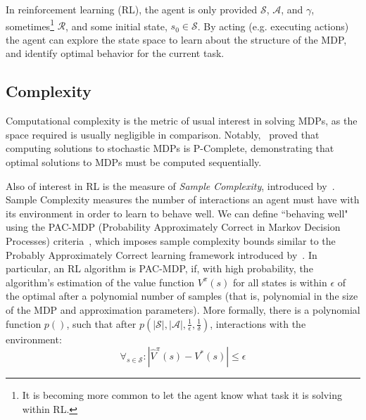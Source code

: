 \documentclass[11pt]{article}
\newcommand\davenote[1]{\textcolor{blue}{Dave: #1}}
\begin{document}

In reinforcement learning (RL), the agent is only provided $\mathcal{S}$, $\mathcal{A}$, and $\gamma$, sometimes\footnote{It is becoming more common to let the agent know what task it is solving within RL.} $\mathcal{R}$, and some initial state, $s_0 \in \mathcal{S}$. By acting (e.g. executing actions) the agent can explore the state space to learn about the structure of the MDP, and identify optimal behavior for the current task.


\subsection{Complexity}

Computational complexity is the metric of usual interest in solving MDPs, as the space required is usually negligible in comparison. Notably,~\cite{papadimitriou1987complexity} proved that computing solutions to stochastic MDPs is P-Complete, demonstrating that optimal solutions to MDPs must be computed sequentially.

Also of interest in RL is the measure of {\it Sample Complexity}, introduced by~\cite{kakade2003sample}. Sample Complexity measures the number of interactions an agent must have with its environment in order to learn to behave well. We can define ``behaving well" using the PAC-MDP (Probability Approximately Correct in Markov Decision Processes) criteria~, which imposes sample complexity bounds similar to the Probably Approximately Correct learning framework introduced by~\cite{valiant1984theory}. In particular, an RL algorithm is PAC-MDP, if, with high probability, the algorithm's estimation of the value function $V^\pi(s)$ for all states is within $\epsilon$ of the optimal after a polynomial number of samples (that is, polynomial in the size of the MDP and approximation parameters). More formally, there is a polynomial function $p()$, such that after $p(|\mathcal{S}|, |\mathcal{A}|, \frac{1}{\epsilon}, \frac{1}{\delta})$, interactions with the environment:
\begin{equation}
\forall_{s \in \mathcal{S}} : |\hat{V}^\pi(s) - V^*(s)| \leq \epsilon
\end{equation}
\end{document}
